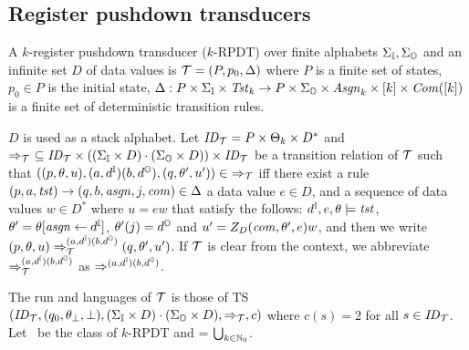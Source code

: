 \subsection{Register pushdown transducers}
\begin{definition}
A $k$-{register pushdown transducer} ($k$-RPDT) over finite alphabets $\Sigma_{\mathbb{I}},\Sigma_{\mathbb{O}}$ and an infinite set $D$ of data values is
${\cal T}=(P, p_0, \Delta)$ where
$P$ is a finite set of states,
$p_0\in P$ is the initial state,
$\Delta: P\times\Sigma_{\mathbb{I}}\times\mathit{Tst}_k \to P\times\Sigma_{\mathbb{O}}\times \mathit{Asgn}_k \times [k]\times \mathit{Com}([k])$ is a finite set of deterministic transition rules.
\end{definition}
$D$ is used as a stack alphabet.
Let $\mathit{ID}_{\cal T}= P\times \Theta_k\times D^*$
and $\Rightarrow_{\cal T}\ \subseteq \mathit{ID}_{\cal T}\times ((\Sigma_{\mathbb{I}}\times D)\cdot(\Sigma_{\mathbb{O}}\times D))\times \mathit{ID}_{\cal T}$ be a transition relation of ${\cal T}$ such that $((p, \theta, u), (a,d^{\mathbb{I}})(b,d^{\mathbb{O}}), (q, \theta', u'))\in\ \Rightarrow_{\cal T}$ iff
there exist a rule $(p, a, \mathit{tst}) \to (q, b, \mathit{asgn}, j, \mathit{com}) \in \Delta$
a data value $e\in D$, and a sequence of data values $w\in D^*$ where $u=ew$ that satisfy the follows:
$d^{\mathbb{I}}, e, \theta\models\mathit{tst}$, $\theta' = \theta[\mathit{asgn}\leftarrow d^{\mathbb{I}}]$, $\theta'(j) = d^{\mathbb{O}}$ and $u'= Z_D(\mathit{com},\theta',e)w$,
and then we write $(p, \theta, u) \Rightarrow_{{\cal T}}^{(a,d^{\mathbb{I}})(b,d^{\mathbb{O}})}(q, \theta', u')$.
If ${\cal T}$ is clear from the context,
we abbreviate
$\Rightarrow_{{\cal T}}^{(a,d^{\mathbb{I}})(b,d^{\mathbb{O}})}$ as $\Rightarrow^{(a,d^{\mathbb{I}})(b,d^{\mathbb{O}})}$.

The run and languages of ${\cal T}$ is those of TS $(\mathit{ID}_{\cal T}, (q_0,\theta_\bot, \bot), (\Sigma_{\mathbb{I}}\times D)\cdot(\Sigma_{\mathbb{O}}\times D), \Rightarrow_{\cal T}, c)$ where $c(s)=2$ for all $s\in\mathit{ID}_{\cal T}$.
Let \RPDTk\ be the class of $k$-RPDT and \RPDT = $\bigcup_{k\in\mathbb{N}_0}$\RPDTk.

